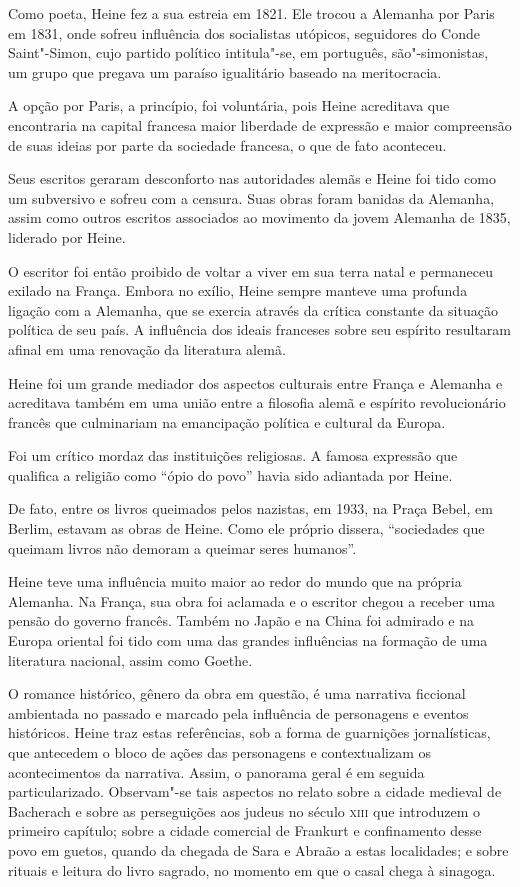\documentclass[12pt]{extarticle}
\begin{document}
Como poeta, Heine fez a sua estreia em 1821. Ele trocou a Alemanha 
por Paris em 1831, onde sofreu influência dos socialistas 
utópicos, seguidores do Conde Saint"-Simon, cujo partido político 
intitula"-se, em português, são"-simonistas, um grupo que pregava 
um paraíso igualitário baseado na meritocracia.

A opção por Paris, a princípio, foi voluntária, pois Heine 
acreditava que encontraria na capital francesa maior 
liberdade de expressão e maior compreensão de suas ideias 
por parte da sociedade francesa, o que de fato aconteceu.

Seus escritos geraram desconforto nas autoridades alemãs e 
Heine foi tido como um subversivo e sofreu com a censura. 
Suas obras foram banidas da Alemanha, assim como outros 
escritos associados ao movimento da jovem Alemanha de 1835, liderado por Heine. 

O escritor foi então proibido de voltar a viver em sua terra natal e 
permaneceu exilado na França. Embora no exílio, Heine sempre 
manteve uma profunda ligação com a Alemanha, que se 
exercia através da crítica constante da situação política 
de seu país. A influência dos ideais franceses sobre seu 
espírito resultaram afinal em uma renovação da literatura alemã.

Heine foi um grande mediador dos aspectos culturais entre 
França e Alemanha e acreditava também em uma união entre 
a filosofia alemã e espírito revolucionário francês 
que culminariam na emancipação política e cultural da Europa.

Foi um crítico mordaz das instituições religiosas. 
A famosa expressão que qualifica a religião 
como ``ópio do povo'' havia sido adiantada por Heine. 

De fato, entre os livros queimados pelos nazistas, em 
1933, na Praça Bebel, em Berlim, estavam as obras 
de Heine. Como ele próprio dissera, ``sociedades 
que queimam livros não demoram a queimar seres humanos''.

Heine teve uma influência muito maior ao redor do 
mundo que na própria Alemanha. Na França, sua obra foi 
aclamada e o escritor chegou a receber uma pensão 
do governo francês. Também no Japão e na China 
foi admirado e na Europa oriental foi tido com uma 
das grandes influências na formação de uma literatura nacional, assim como Goethe.

O romance histórico, gênero da obra em questão, é 
uma narrativa ficcional ambientada no passado 
e marcado pela influência de personagens e eventos históricos. 
Heine traz estas referências, sob a forma de guarnições jornalísticas,
que antecedem o bloco de ações das personagens e contextualizam os
acontecimentos da narrativa. Assim, o panorama geral é em seguida
particularizado. Observam"-se tais aspectos no relato sobre a cidade
medieval de Bacherach e sobre as perseguições aos judeus no século \textsc{xiii}
que introduzem o primeiro capítulo; sobre a cidade comercial de Frankurt
e confinamento desse povo em guetos, quando da chegada de Sara e Abraão
a estas localidades; e sobre rituais e leitura do livro sagrado, no
momento em que o casal chega à sinagoga.
\end{document}
